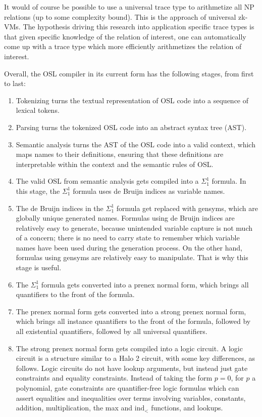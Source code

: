\documentclass[11pt]{article}
\begin{document}
It would of course be possible to use a universal trace type to arithmetize all NP relations (up to some complexity bound). This is the approach of universal zk-VMs. The hypothesis driving this research into application specific trace types is that given specific knowledge of the relation of interest, one can automatically come up with a trace type which more efficiently arithmetizes the relation of interest.

Overall, the OSL compiler in its current form has the following stages, from first to last:

\begin{enumerate}
	\item Tokenizing turns the textual representation of OSL code into a sequence of lexical tokens.
	\item Parsing turns the tokenized OSL code into an abstract syntax tree (AST).
	\item Semantic analysis turns the AST of the OSL code into a valid context, which maps names to their definitions, ensuring that these definitions are interpretable within the context and the semantic rules of OSL.
	\item The valid OSL from semantic analysis gets compiled into a $\Sigma^1_1$ formula. In this stage, the $\Sigma^1_1$ formula uses de Bruijn indices as variable names.
	\item The de Bruijn indices in the $\Sigma^1_1$ formula get replaced with gensyms, which are globally unique generated names. Formulas using de Bruijn indices are relatively easy to generate, because unintended variable capture is not much of a concern; there is no need to carry state to remember which variable names have been used during the generation process. On the other hand, formulas using gensyms are relatively easy to manipulate. That is why this stage is useful.
	\item The $\Sigma^1_1$ formula gets converted into a prenex normal form, which brings all quantifiers to the front of the formula.
	\item The prenex normal form gets converted into a strong prenex normal form, which brings all instance quantifiers to the front of the formula, followed by all existential quantifiers, followed by all universal quantifiers.
	\item The strong prenex normal form gets compiled into a logic circuit. A logic circuit is a structure similar to a Halo 2 circuit, with some key differences, as follows. Logic circuits do not have lookup arguments, but instead just gate constraints and equality constraints. Instead of taking the form $p = 0$, for $p$ a polynomial, gate constraints are quantifier-free logic formulas which can assert equalities and inequalities over terms involving variables, constants, addition, multiplication, the max and $\text{ind}_<$ functions, and lookups.


\end{enumerate}
\end{document}
